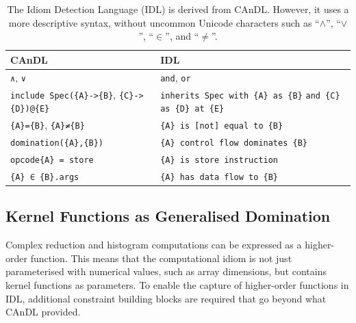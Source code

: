 \begin{table}[H]
    \lstset{keepspaces}
    \centering
    \begin{tabular}{p{}p{}}
        \toprule
        {\bf CAnDL} & {\bf IDL}\\
        \midrule
        {\lstinline[language=CAnDL]!∧!}, {\lstinline[language=CAnDL]!∨!} &
        {\lstinline[language=IDL]!and!}, {\lstinline[language=IDL]!or!} \\
        {\lstinline[language=CAnDL]!include Spec({A}->{B}!}, \vspace{-2.5mm}\newline
        {\phantom{\lstinline[language=CAnDL]!include Spec(!}\lstinline[language=CAnDL]!{C}->{D})@{E}!} &
        {\lstinline[language=IDL]!inherits Spec with {A} as {B}!} \vspace{-2.5mm}\newline
        {\phantom{\lstinline[language=IDL]!inherits Spec!}\hspace{4.4mm}\lstinline[language=IDL]!and {C} as {D} at {E}!}\\
        {\lstinline[language=CAnDL]!{A}={B}!},
        {\lstinline[language=CAnDL]!{A}≠{B}!} &
        {\lstinline[language=IDL]!{A} is [not] equal to {B}!} \\
        {\lstinline[language=CAnDL]!domination({A},{B})!} &
        {\lstinline[language=IDL]!{A} control flow dominates {B}!} \\
        {\lstinline[language=CAnDL]!opcode{A} = store!} &
        {\lstinline[language=IDL]!{A} is store instruction!} \\
        {\lstinline[language=CAnDL]!{A} ∈ {B}.args!} &
        {\lstinline[language=IDL]!{A} has data flow to {B}!} \\
        \bottomrule
    \end{tabular}
    \caption{The Idiom Detection Language (IDL) is derived from CAnDL.
             However, it uses a more descriptive syntax, without uncommon
             Unicode characters such as ``$\land$'', ``$\lor$'', ``$\in$'',
             and ``$\neq$''.}
    \label{CanDLtoIDL}
\end{table}

\subsection{Kernel Functions as Generalised Domination}

    Complex reduction and histogram computations can be expressed as a
    higher-order function.
    This means that the computational idiom is not just parameterised with
    numerical values, such as array dimensions, but contains kernel functions
    as parameters.
    To enable the capture of higher-order functions in IDL, additional
    constraint building blocks are required that go beyond what CAnDL
    provided.

